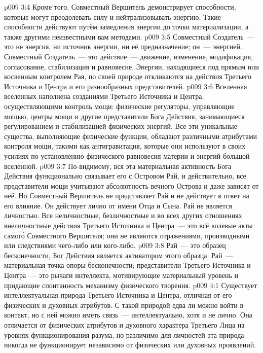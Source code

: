 \vs p009 3:4 Кроме того, Совместный Вершитель демонстрирует способности, которые могут преодолевать силу и нейтрализовывать энергию. Такие способности действуют путём замедления энергии до точки материализации, а также другими неизвестными вам методами.
\vs p009 3:5 \pc Совместный Создатель~--- это не энергия, ни источник энергии, ни её предназначение; он~---  энергией. Совместный Создатель~--- это действие~--- движение, изменение, модификация, согласование, стабилизация и равновесие. Энергии, находящиеся под прямым или косвенным контролем Рая, по своей природе откликаются на действия Третьего Источника и Центра и его разнообразных представителей.
\vs p009 3:6 Вселенная вселенных наполнена созданиями Третьего Источника и Центра, осуществляющими контроль мощи: физические регуляторы, управляющие мощью, центры мощи и другие представители Бога Действия, занимающиеся регулированием и стабилизацией физических энергий. Все эти уникальные существа, выполняющие физические функции, обладают различными атрибутами контроля мощи, такими как антигравитация, которые они используют в своих усилиях по установлению физического равновесия материи и энергий большой вселенной.
\vs p009 3:7 По\hyp{}видимому, вся эта материальная активность Бога Действия функционально связывает его с Островом Рай, и действительно, все представители мощи учитывают абсолютность вечного Острова и даже зависят от неё. Но Совместный Вершитель не представляет Рай и не действует в ответ на его влияние. Он действует лично от имени Отца и Сына. Рай не является личностью. Все неличностные, безличностные и во всех других отношениях внеличностные действия Третьего Источника и Центра~--- это всё волевые акты самог\'о Совместного Вершителя; они не являются отражениями, производными или следствиями чего\hyp{}либо или кого\hyp{}либо.
\vs p009 3:8 Рай~--- это образец бесконечности, Бог Действия является активатором этого образца. Рай~--- материальная точка опоры бесконечности; представители Третьего Источника и Центра~--- это рычаги интеллекта, мотивирующие материальный уровень и придающие спонтанность механизму физического творения.
\vs p009 4:1 Существует интеллектуальная природа Третьего Источника и Центра, отличная от его физических и духовных атрибутов. С такой природой едва ли можно войти в контакт, но с ней можно иметь связь~--- интеллектуально, хотя и не лично. Она отличается от физических атрибутов и духовного характера Третьего Лица на уровнях функционирования разума, но различимо для личностей эта природа никогда не функционирует независимо от физических или духовных проявлений.
